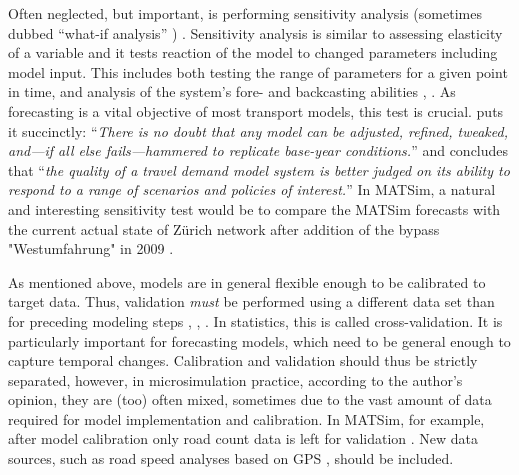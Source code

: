 Often neglected, but important, is performing sensitivity analysis (sometimes dubbed ``what-if analysis'' \citep[][p.155]{Kleijnen_EJOR_1995}) \citep[][]{KurthEtAl_TRBTDF_2006, CambridgeSystematics_manual_2008, CFD_TRB_2007}. Sensitivity analysis is similar to assessing elasticity of a variable \citep[][p.3f]{WegmannEverett_TechRep_CTRUT_2008} and it tests reaction of the model to changed parameters including model input. This includes both testing the range of parameters for a given point in time, and analysis of the system's fore- and backcasting abilities \citep[e.g.,][p.56]{CFD_TRB_2007}, \citep[][]{CambridgeSystematics_manual_2008}. As forecasting is a vital objective of most transport models, this test is crucial. \citet[][p.158]{PendyalaBhat_TRBTDF_2006} puts it succinctly: ``\emph{There is no doubt that any model can be adjusted, refined, tweaked, and---if all else fails---hammered to replicate base-year conditions.}'' and concludes that ``\emph{the quality of a travel demand model system is better judged on its ability to respond to a range of scenarios and policies of interest.}'' In MATSim, a natural and interesting sensitivity test would be to compare the MATSim forecasts with the current actual state of Zürich network after addition of the bypass "Westumfahrung" in 2009 \citep[][]{BalmerEtAl_ResRep_bdktzrh_2009, Westumfahrung_Webpage_2008}.

As mentioned above, models are in general flexible enough to be calibrated to target data. Thus, validation \emph{must} be performed using a different data set than for preceding modeling steps \citep[][p.1]{CambridgeSystematics_manual_2008}, \citep[][p.56]{CFD_TRB_2007}, \citep[][p.18]{OrtuzarWillumsen_2001}. In statistics, this is called cross-validation. It is particularly important for forecasting models, which need to be general enough to capture temporal changes. Calibration and validation should thus be strictly separated, however, in microsimulation practice, according to the author's opinion, they are (too) often mixed, sometimes due to the vast amount of data required for model implementation and calibration. In MATSim, for example, after model calibration only road count data is left for validation \citep[][]{HorniEtAl_STRC_2009}. New data sources, such as road speed analyses based on GPS \citep[][]{HackneyEtAl_JGS_2007}, should be included.

